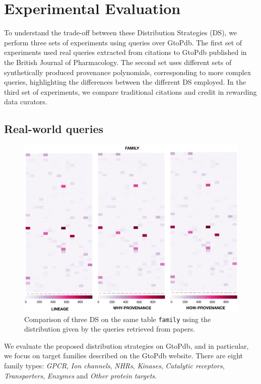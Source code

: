 \section{Experimental Evaluation}
\label{sec:experiments}
To understand the trade-off between these Distribution Strategies (DS), we perform three sets of experiments using queries over GtoPdb.  The first set of experiments used real queries extracted from citations to GtoPdb published in the British Journal of Pharmacology.  
The second set uses different sets of synthetically produced provenance polynomials, corresponding to more complex queries, highlighting the differences between the different DS employed.
In the third set of experiments, we compare traditional citations and credit in rewarding data curators. 

\subsection{Real-world queries}
\label{sec:real_world_queries}

\begin{figure}[t]
  \includegraphics[width=1\textwidth]{figures/paper_based}
  \caption{Comparison of three DS on the same table \texttt{family} using the distribution given by the queries retrieved from papers.}
  \label{figure:comparison_on_papers}
\end{figure}


We evaluate the proposed distribution strategies on GtoPdb, and in particular, we focus on target families described on the GtoPdb website. 
There are eight family types: \emph{GPCR}, \emph{Ion channels}, \emph{NHRs}, \emph{Kinases}, \emph{Catalytic receptors}, \emph{Transporters}, \emph{Enzymes} and \emph{Other protein targets}.  

